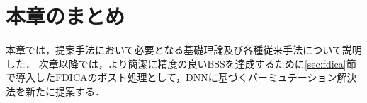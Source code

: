 \section{本章のまとめ}
\label{sec:conclu}
本章では，提案手法において必要となる基礎理論及び各種従来手法について説明した．
次章以降では，より簡潔に精度の良いBSSを達成するために\ref{sec:fdica}節で導入したFDICAのポスト処理として，DNNに基づくパーミュテーション解決法を新たに提案する．
















